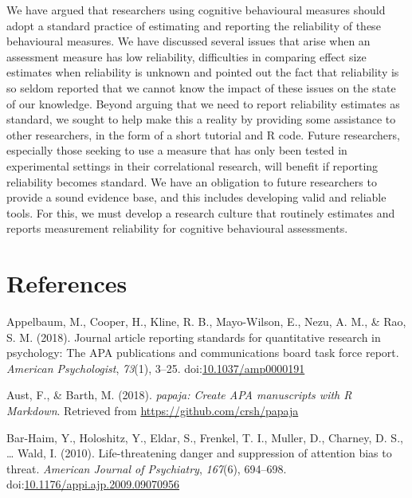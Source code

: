 \documentclass[english,,man,floatsintext]{apa6}
\begin{document}
We have argued that researchers using cognitive behavioural measures should adopt a standard practice of estimating and reporting the reliability of these behavioural measures. We have discussed several issues that arise when an assessment measure has low reliability, difficulties in comparing effect size estimates when reliability is unknown and pointed out the fact that reliability is so seldom reported that we cannot know the impact of these issues on the state of our knowledge. Beyond arguing that we need to report reliability estimates as standard, we sought to help make this a reality by providing some assistance to other researchers, in the form of a short tutorial and R code. Future researchers, especially those seeking to use a measure that has only been tested in experimental settings in their correlational research, will benefit if reporting reliability becomes standard. We have an obligation to future researchers to provide a sound evidence base, and this includes developing valid and reliable tools. For this, we must develop a research culture that routinely estimates and reports measurement reliability for cognitive behavioural assessments.

\newpage

\hypertarget{references}{%
\section{References}\label{references}}

\setlength{\parindent}{-0.5in}
\setlength{\leftskip}{0.5in}
\setlength{\parskip}{8pt}

\noindent

\hypertarget{refs}{}
\leavevmode\hypertarget{ref-appelbaum_journal_2018}{}%
Appelbaum, M., Cooper, H., Kline, R. B., Mayo-Wilson, E., Nezu, A. M., \& Rao, S. M. (2018). Journal article reporting standards for quantitative research in psychology: The APA publications and communications board task force report. \emph{American Psychologist}, \emph{73}(1), 3--25. doi:\href{https://doi.org/10.1037/amp0000191}{10.1037/amp0000191}

\leavevmode\hypertarget{ref-R-papaja}{}%
Aust, F., \& Barth, M. (2018). \emph{papaja: Create APA manuscripts with R Markdown}. Retrieved from \url{https://github.com/crsh/papaja}

\leavevmode\hypertarget{ref-bar-haim_life-threatening_2010}{}%
Bar-Haim, Y., Holoshitz, Y., Eldar, S., Frenkel, T. I., Muller, D., Charney, D. S., \ldots{} Wald, I. (2010). Life-threatening danger and suppression of attention bias to threat. \emph{American Journal of Psychiatry}, \emph{167}(6), 694--698. doi:\href{https://doi.org/10.1176/appi.ajp.2009.09070956}{10.1176/appi.ajp.2009.09070956}
\end{document}
